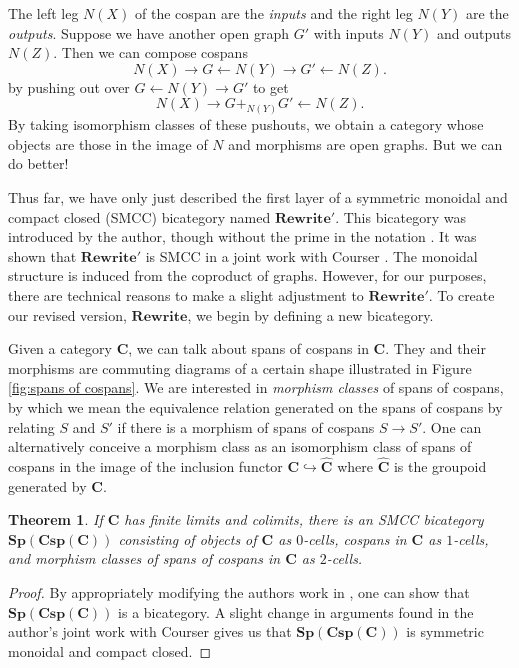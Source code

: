 \documentclass[]{amsart}
\newtheorem{thm}{Theorem}[section]
\theoremstyle{defn}
\begin{document}
The left leg $N(X)$ of the cospan are the \emph{inputs} and the right leg $N(Y)$ are the \emph{outputs}.  Suppose we have another open graph $G'$ with inputs $N(Y)$ and outputs $N(Z)$.  Then we can compose cospans 
\[
N(X) \to G \gets N(Y) \to G' \gets N(Z). 
\] 
by pushing out over $G \gets N(Y) \to G'$ to get 
\[
N(X) \to G +_{N(Y)} G' \gets N(Z).
\] 
By taking isomorphism classes of these pushouts, we obtain a category whose objects are those in the image of $N$ and morphisms are open graphs. But we can do better! 

Thus far, we have only just described the first layer of a symmetric monoidal and compact closed (SMCC) bicategory named $\mathbf{Rewrite'}$.  This bicategory was introduced by the author, though without the prime in the notation \cite{Cicala_SpansCospans}. It was shown that $\mathbf{Rewrite'}$ is SMCC in a joint work with Courser \cite{CicalaCourser_BicatSpansCospan}. The monoidal structure is induced from the coproduct of graphs.  However, for our purposes, there are technical reasons to make a slight adjustment to $\mathbf{Rewrite'}$.  To create our revised version, $\mathbf{Rewrite}$, we begin by defining a new bicategory.

Given a category $\mathbf{C}$, we can talk about spans of cospans in $\mathbf{C}$.  They and their morphisms are commuting diagrams of a certain shape illustrated in Figure \ref{fig:spans of cospans}.  We are interested in \emph{morphism classes} of spans of cospans, by which we mean the equivalence relation generated on the spans of cospans by relating $S$ and $S'$ if there is a morphism of spans of cospans $S \to S'$.  One can alternatively conceive a morphism class as an isomorphism class of spans of cospans in the image of the inclusion functor $\mathbf{C} \hookrightarrow \widehat{\mathbf{C}}$ where $\widehat{\mathbf{C}}$ is the groupoid generated by $\mathbf{C}$.   

\begin{thm}
	\label{thm:SpCspC is SMCC bicategory}
	If $\mathbf{C}$ has finite limits and colimits, there is an SMCC bicategory $\mathbf{Sp}(\mathbf{Csp}(\mathbf{C}))$ consisting of objects of $\mathbf{C}$ as $0$-cells, cospans in $\mathbf{C}$ as $1$-cells, and morphism classes of spans of cospans in $\mathbf{C}$ as $2$-cells. 
\end{thm}
\begin{proof}
	By appropriately modifying the authors work in \cite{Cicala_SpansCospans}, one can show that $\mathbf{Sp}(\mathbf{Csp}(\mathbf{C}))$ is a bicategory.  A slight change in arguments found in the author's joint work with Courser \cite{CicalaCourser_BicatSpansCospan} gives us that $\mathbf{Sp}(\mathbf{Csp}(\mathbf{C}))$ is symmetric monoidal and compact closed.
\end{proof}
\end{document}
